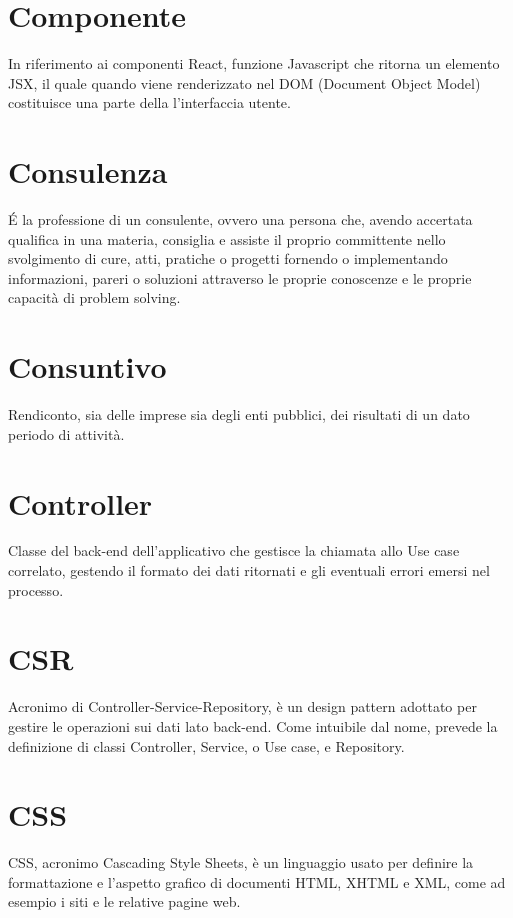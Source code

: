 \section{Componente}\label{sec:Componente}
In riferimento ai componenti React, funzione Javascript che ritorna un elemento JSX, il quale quando viene renderizzato nel DOM (Document Object Model) costituisce una parte della l'interfaccia utente.

\section{Consulenza}\label{sec:Consulenze}
É la professione di un consulente, ovvero una persona che, avendo accertata qualifica in una materia, consiglia e assiste il proprio committente nello svolgimento di cure, atti, pratiche o progetti fornendo o implementando informazioni, pareri o soluzioni attraverso le proprie conoscenze e le proprie capacità di problem solving.

\section{Consuntivo}\label{sec:Consuntivi}
Rendiconto, sia delle imprese sia degli enti pubblici, dei risultati di un dato periodo di attività.

\section{Controller}\label{sec:Controller}
Classe del back-end dell'applicativo che gestisce la chiamata allo Use case correlato, gestendo il formato dei dati ritornati e gli eventuali errori emersi nel processo.

\section{CSR}\label{sec:Controller-Service-Repository}
Acronimo di Controller-Service-Repository, è un design pattern adottato per gestire le operazioni sui dati lato back-end. Come intuibile dal nome, prevede la definizione di classi Controller, Service, o Use case, e Repository.

\section{CSS}\label{sec:Cascading Style Sheets}
CSS, acronimo Cascading Style Sheets, è un linguaggio usato per definire la formattazione e l'aspetto grafico di documenti HTML, XHTML e XML, come ad esempio i siti e le relative pagine web.